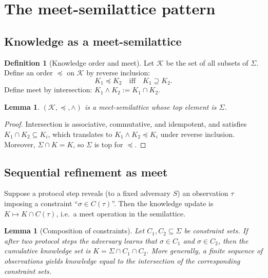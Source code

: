 \documentclass[11pt,a4paper]{article}
\newtheorem{lemma}[theorem]{Lemma}
\theoremstyle{definition}
\newtheorem{definition}[theorem]{Definition}
\theoremstyle{remark}
\begin{document}
\section{The meet-semilattice pattern}
\label{sec:meet-semilattice}

\subsection{Knowledge as a meet-semilattice}
\begin{definition}[Knowledge order and meet]
\label{def:knowledge-semilattice}
Let \(\mathcal{K}\) be the set of all subsets of \(\Sigma\). Define an order \(\preceq\) on \(\mathcal{K}\) by reverse inclusion:
\[
K_1 \preceq K_2 \quad \text{iff} \quad K_1 \supseteq K_2.
\]
Define meet by intersection: \(K_1 \wedge K_2 := K_1 \cap K_2\).
\end{definition}

\begin{lemma}
\label{lem:semilattice}
\((\mathcal{K}, \preceq, \wedge)\) is a meet-semilattice whose top element is \(\Sigma\).
\end{lemma}

\begin{proof}
Intersection is associative, commutative, and idempotent, and satisfies \(K_1 \cap K_2 \subseteq K_i\), which translates to \(K_1\wedge K_2 \preceq K_i\) under reverse inclusion. Moreover, \(\Sigma\cap K = K\), so \(\Sigma\) is top for \(\preceq\).
\end{proof}

\subsection{Sequential refinement as meet}
Suppose a protocol step reveals (to a fixed adversary \(S\)) an observation \(\tau\) imposing a constraint ``\(\sigma\in C(\tau)\)''. Then the knowledge update is \(K \mapsto K \cap C(\tau)\), i.e.\ a meet operation in the semilattice.

\begin{lemma}[Composition of constraints]
\label{lem:constraint-composition}
Let \(C_1,C_2\subseteq \Sigma\) be constraint sets. If after two protocol steps the adversary learns that \(\sigma\in C_1\) and \(\sigma\in C_2\), then the cumulative knowledge set is \(K = \Sigma \cap C_1 \cap C_2\). More generally, a finite sequence of observations yields knowledge equal to the intersection of the corresponding constraint sets.
\end{lemma}
\end{document}

